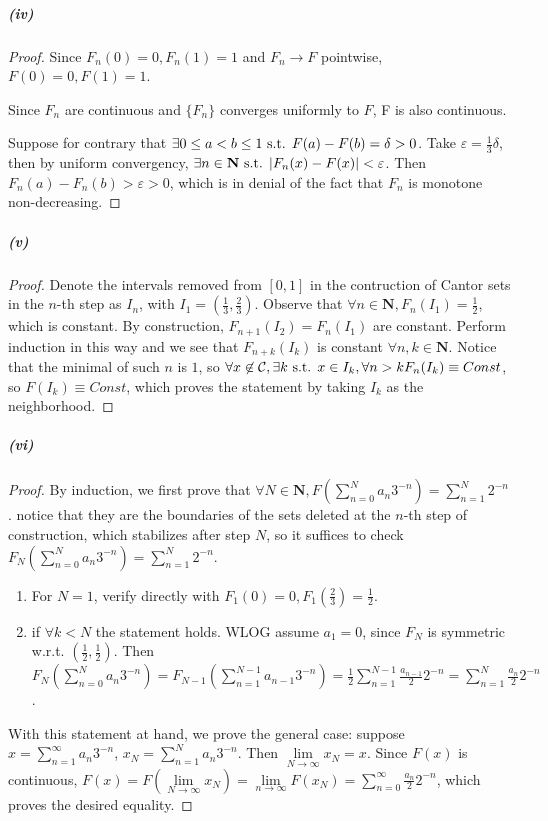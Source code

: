\documentclass{article}
\begin{document}
\subparagraph{(iv)}
\begin{proof}
Since $F_n(0)=0, F_n(1)=1$ and $F_n\to F$ pointwise, $F(0)=0, F(1)=1$.

Since $F_n$ are continuous and $\{F_n\}$ converges uniformly to $F$, F is also continuous.

Suppose for contrary that $\exists 0\leq a<b\leq 1\text{ s.t. } F(a)-F(b)=\delta>0$. Take $\varepsilon=\frac 1 3\delta$, then by uniform convergency, $\exists n\in\mathbf{N}\text{ s.t. } |F_n(x)-F(x)|<\varepsilon$. Then $F_n(a)-F_n(b)>\varepsilon>0$, which is in denial of the fact that $F_n$ is monotone non-decreasing. 
\end{proof}

\subparagraph{(v)}
\begin{proof}
Denote the intervals removed from $[0,1]$ in the contruction of Cantor sets in the $n$-th step as $I_n$, with $I_1=(\frac 1 3, \frac 2 3)$. Observe that $\forall n\in \mathbf{N}, F_n(I_1)=\frac 1 2$, which is constant. By construction, $F_{n+1}(I_2)=F_{n}(I_1)$ are constant. Perform induction in this way and we see that $F_{n+k}(I_k)$ is constant $\forall n,k\in\mathbf{N}$. Notice that the minimal of such $n$ is $1$, so $\forall x\not\in \mathcal{C}, \exists k\text{ s.t. } x\in I_k, \forall n>k F_n(I_k)\equiv Const$, so $F(I_k)\equiv Const$, which proves the statement by taking $I_k$ as the neighborhood. 
\end{proof}

\subparagraph{(vi)}
\begin{proof}
By induction, we first prove that $\forall N\in\mathbf{N}, F(\sum\limits_{n=0}^Na_n3^{-n})=\sum\limits_{n=1}^N 2^{-n}$. notice that they are the boundaries of the sets deleted at the $n$-th step of construction, which stabilizes after step $N$, so it suffices to check $F_N(\sum\limits_{n=0}^Na_n3^{-n})=\sum\limits_{n=1}^N 2^{-n}$.
\begin{enumerate}
\item For $N=1$, verify directly with $F_1(0)=0, F_1(\frac 2 3)=\frac 1 2$.
\item if $\forall k<N$ the statement holds. WLOG assume $a_1=0$, since $F_N$ is symmetric w.r.t. $(\frac 1 2, \frac 1 2)$. Then $F_N(\sum\limits_{n=0}^Na_n3^{-n})=F_{N-1}(\sum\limits_{n=1}^{N-1} a_{n-1}3^{-n})=\frac 1 2\sum\limits_{n=1}^{N-1}\frac{a_{n-1}}{2}2^{-n}=\sum\limits_{n=1}^{N}\frac {a_n}{2}2^{-n}$. 
\end{enumerate}
With this statement at hand, we prove the general case: suppose $x=\sum\limits_{n=1}^{\infty}a_n3^{-n}$, $x_N=\sum\limits_{n=1}^N a_n3^{-n}$. Then $\lim\limits_{N\to\infty}x_N=x$. Since $F(x)$ is continuous, $F(x)=F(\lim\limits_{N\to\infty}x_N)=\lim\limits_{n\to\infty}F(x_N)=\sum\limits_{n=0}^\infty \frac{a_n}{2}2^{-n}$, which proves the desired equality.
\end{proof}
\end{document}
